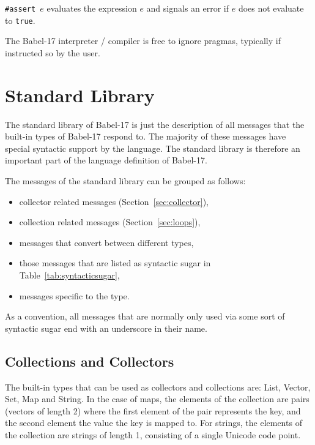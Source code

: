 \documentclass[11pt]{amsart}
\newcommand{\babelsrc}[1] {\lstinline!#1!}
\begin{document}
\texttt{\#assert $e$} evaluates the expression $e$ and signals an error if $e$ does not evaluate to \babelsrc{true}.

The Babel-17 interpreter / compiler is free to ignore pragmas, typically if instructed so by the user. 

\section{Standard Library}
The standard library of Babel-17 is just the description of all messages that the built-in types of Babel-17 respond to. The majority of these messages have special syntactic support by the language. The standard library is therefore an important part of the language definition of Babel-17.

The messages of the standard library can be grouped as follows:
\begin{itemize}
\item collector related messages (Section~\ref{sec:collector}),
\item collection related messages (Section~\ref{sec:loops}),
\item messages that convert between different types,
\item those messages that are listed as syntactic sugar in Table~\ref{tab:syntacticsugar},
\item messages specific to the type. 
\end{itemize}

As a convention, all messages that are normally only used via some sort of syntactic sugar end with an underscore in their name.

\subsection{Collections and Collectors}
The built-in types that can be used as collectors and collections are: List, Vector, Set, Map and String. In the case of maps,
the elements of the collection are pairs (vectors of length 2) where the first element of the pair represents the key, and the second element the value the key is mapped to. For strings, the elements of the collection are strings of length 1, consisting of a single Unicode code point. 
\end{document}
